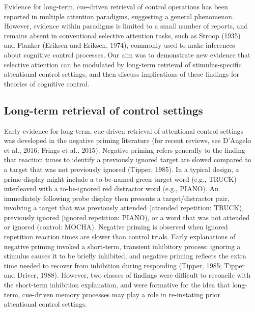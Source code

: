 \documentclass[]{DissertateCUNY}
\begin{document}
Evidence for long-term, cue-driven retrieval of control operations has
been reported in multiple attention paradigms, suggesting a general
phenomenon. However, evidence within paradigms is limited to a small
number of reports, and remains absent in conventional selective
attention tasks, such as Stroop (1935) and Flanker (Eriksen and Eriksen,
1974), commonly used to make inferences about cognitive control
processes. Our aim was to demonstrate new evidence that selective
attention can be modulated by long-term retrieval of stimulus-specific
attentional control settings, and then discuss implications of these
findings for theories of cognitive control.

\hypertarget{long-term-retrieval-of-control-settings}{%
\subsection{Long-term retrieval of control
settings}\label{long-term-retrieval-of-control-settings}}

Early evidence for long-term, cue-driven retrieval of attentional
control settings was developed in the negative priming literature (for
recent reviews, see D'Angelo et al., 2016; Frings et al., 2015).
Negative priming refers generally to the finding that reaction times to
identify a previously ignored target are slowed compared to a target
that was not previously ignored (Tipper, 1985). In a typical design, a
prime display might include a to-be-named green target word (e.g.,
TRUCK) interleaved with a to-be-ignored red distractor word (e.g.,
PIANO). An immediately following probe display then presents a
target/distractor pair, involving a target that was previously attended
(attended repetition: TRUCK), previously ignored (ignored repetition:
PIANO), or a word that was not attended or ignored (control: MOCHA).
Negative priming is observed when ignored repetition reaction times are
slower than control trials. Early explanations of negative priming
invoked a short-term, transient inhibitory process: ignoring a stimulus
causes it to be briefly inhibited, and negative priming reflects the
extra time needed to recover from inhibition during responding (Tipper,
1985; Tipper and Driver, 1988). However, two classes of findings were
difficult to reconcile with the short-term inhibition explanation, and
were formative for the idea that long-term, cue-driven memory processes
may play a role in re-instating prior attentional control settings.
\end{document}
